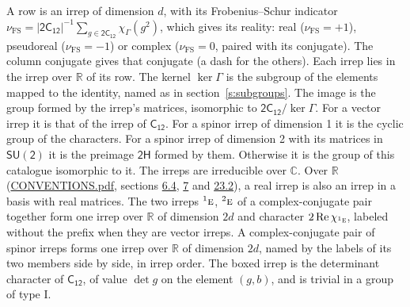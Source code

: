\documentclass[10pt,a4paper]{article}
\numberwithin{equation}{section}
\newcommand{\grp}[1]{\mathsf{#1}}
\newcommand{\irr}[1]{\text{\normalfont\scshape #1}}
\newcommand{\conjpair}[1]{{}^{#1}}
\newcommand{\irchar}[1]{\chi_{#1}}
\newcommand{\fsind}{\nu_{\mathrm{FS}}}
\begin{document}
\leavevmode\label{n:index.frobenius}\label{n:head.irrep}\label{n:head.reality}A row is an irrep of dimension $d$, with its Frobenius--Schur indicator $\fsind = |\grp{2C_{12}}|^{-1}\allowbreak\sum_{g\in\grp{2C_{12}}}\irchar{\Gamma}(g^2)$, which gives its reality: real ($\fsind = +1$), pseudoreal ($\fsind = -1$) or complex ($\fsind = 0$, paired with its conjugate). \label{n:head.conjugate}The column conjugate gives that conjugate (a dash for the others). \label{n:head.over.real}Each irrep lies in the irrep over $\mathbb{R}$ of its row. \label{n:head.kernel}The kernel $\ker\Gamma$ is the subgroup of the elements mapped to the identity, named as in section~\ref{s:subgroups}. \label{n:head.image}The image is the group formed by the irrep's matrices, isomorphic to $\grp{2C_{12}}/\ker\Gamma$. For a vector irrep it is that of the irrep of \href{../../../rotation/data/pdf/C12.pdf}{$\grp{C_{12}}$}. For a spinor irrep of dimension 1 it is the cyclic group of the characters. For a spinor irrep of dimension 2 with its matrices in $\grp{SU(2)}$ it is the preimage $\grp{2H}$ formed by them. Otherwise it is the group of this catalogue isomorphic to it. The irreps are irreducible over $\mathbb{C}$. Over $\mathbb{R}$ (\href{../../CONVENTIONS.pdf}{CONVENTIONS.pdf}, sections \href{../../../rotation/CONVENTIONS.pdf\#conv.6.4}{6.4}, \href{../../../rotation/CONVENTIONS.pdf\#conv.7}{7} and \href{../../CONVENTIONS.pdf\#conv.23.2}{23.2}), a real irrep is also an irrep in a basis with real matrices. The two irreps $\conjpair{1}\irr{e}$, $\conjpair{2}\irr{e}$ of a complex-conjugate pair together form one irrep over $\mathbb{R}$ of dimension $2d$ and character $2\operatorname{Re}\irchar{\conjpair{1}\irr{e}}$, labeled without the prefix when they are vector irreps. A complex-conjugate pair of spinor irreps forms one irrep over $\mathbb{R}$ of dimension $2d$, named by the labels of its two members side by side, in irrep order. \label{n:mark.determinant}The boxed irrep is the determinant character of \href{../../../rotation/data/pdf/C12.pdf}{$\grp{C_{12}}$}, of value $\det g$ on the element $(g, b)$, and is trivial in a group of type I.
\setlength{\emergencystretch}{2em}\par\setlength{\emergencystretch}{0pt}
\end{document}

